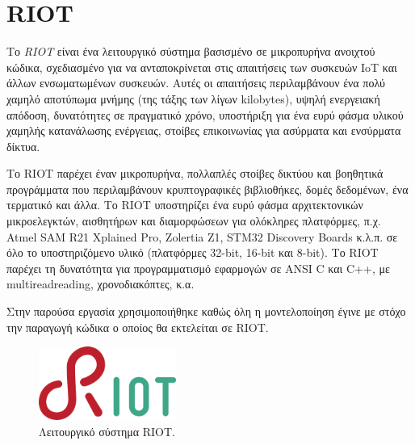 \section{RIOT}
\label{sec:riot}

Το \textit{RIOT} \cite{bib:riot} είναι ένα λειτουργικό σύστημα βασισμένο σε μικροπυρήνα ανοιχτού κώδικα, σχεδιασμένο για να ανταποκρίνεται στις απαιτήσεις των συσκευών IoT και άλλων ενσωματωμένων συσκευών. Αυτές οι απαιτήσεις περιλαμβάνουν ένα πολύ χαμηλό αποτύπωμα μνήμης (της τάξης των λίγων kilobytes), υψηλή ενεργειακή απόδοση, δυνατότητες σε πραγματικό χρόνο, υποστήριξη για ένα ευρύ φάσμα υλικού χαμηλής κατανάλωσης ενέργειας, στοίβες επικοινωνίας για ασύρματα και ενσύρματα δίκτυα.

Το RIOT παρέχει έναν μικροπυρήνα, πολλαπλές στοίβες δικτύου και βοηθητικά προγράμματα που περιλαμβάνουν κρυπτογραφικές βιβλιοθήκες, δομές δεδομένων, ένα τερματικό και άλλα. Το RIOT υποστηρίζει ένα ευρύ φάσμα αρχιτεκτονικών μικροελεγκτών, αισθητήρων και διαμορφώσεων για ολόκληρες πλατφόρμες, π.χ. Atmel SAM R21 Xplained Pro, Zolertia Z1, STM32 Discovery Boards κ.λ.π. σε όλο το υποστηριζόμενο υλικό (πλατφόρμες 32-bit, 16-bit και 8-bit). Το RIOT παρέχει τη δυνατότητα για προγραμματισμό εφαρμογών σε ANSI C και C++, με multireadreading, χρονοδιακόπτες, κ.α.

Στην παρούσα εργασία χρησιμοποιήθηκε καθώς όλη η μοντελοποίηση έγινε με στόχο την παραγωγή κώδικα ο οποίος θα εκτελείται σε RIOT.

\begin{figure}[!ht]
  \centering
  \includegraphics[width=0.4\textwidth]{./images/chapter4/riot.png}
  \caption[Λειτουργικό σύστημα RIOT.]{Λειτουργικό σύστημα RIOT.\footnotemark}
  \label{fig:riot}
\end{figure}

